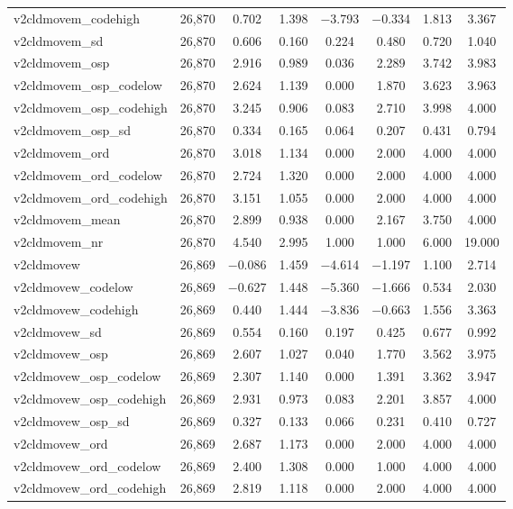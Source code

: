 \begin{table}[!htbp]
\begin{tabular}{@{\extracolsep{5pt}}lccccccc}
v2cldmovem\_codehigh & 26,870 & 0.702 & 1.398 & $-$3.793 & $-$0.334 & 1.813 & 3.367 \\ 
v2cldmovem\_sd & 26,870 & 0.606 & 0.160 & 0.224 & 0.480 & 0.720 & 1.040 \\ 
v2cldmovem\_osp & 26,870 & 2.916 & 0.989 & 0.036 & 2.289 & 3.742 & 3.983 \\ 
v2cldmovem\_osp\_codelow & 26,870 & 2.624 & 1.139 & 0.000 & 1.870 & 3.623 & 3.963 \\ 
v2cldmovem\_osp\_codehigh & 26,870 & 3.245 & 0.906 & 0.083 & 2.710 & 3.998 & 4.000 \\ 
v2cldmovem\_osp\_sd & 26,870 & 0.334 & 0.165 & 0.064 & 0.207 & 0.431 & 0.794 \\ 
v2cldmovem\_ord & 26,870 & 3.018 & 1.134 & 0.000 & 2.000 & 4.000 & 4.000 \\ 
v2cldmovem\_ord\_codelow & 26,870 & 2.724 & 1.320 & 0.000 & 2.000 & 4.000 & 4.000 \\ 
v2cldmovem\_ord\_codehigh & 26,870 & 3.151 & 1.055 & 0.000 & 2.000 & 4.000 & 4.000 \\ 
v2cldmovem\_mean & 26,870 & 2.899 & 0.938 & 0.000 & 2.167 & 3.750 & 4.000 \\ 
v2cldmovem\_nr & 26,870 & 4.540 & 2.995 & 1.000 & 1.000 & 6.000 & 19.000 \\ 
v2cldmovew & 26,869 & $-$0.086 & 1.459 & $-$4.614 & $-$1.197 & 1.100 & 2.714 \\ 
v2cldmovew\_codelow & 26,869 & $-$0.627 & 1.448 & $-$5.360 & $-$1.666 & 0.534 & 2.030 \\ 
v2cldmovew\_codehigh & 26,869 & 0.440 & 1.444 & $-$3.836 & $-$0.663 & 1.556 & 3.363 \\ 
v2cldmovew\_sd & 26,869 & 0.554 & 0.160 & 0.197 & 0.425 & 0.677 & 0.992 \\ 
v2cldmovew\_osp & 26,869 & 2.607 & 1.027 & 0.040 & 1.770 & 3.562 & 3.975 \\ 
v2cldmovew\_osp\_codelow & 26,869 & 2.307 & 1.140 & 0.000 & 1.391 & 3.362 & 3.947 \\ 
v2cldmovew\_osp\_codehigh & 26,869 & 2.931 & 0.973 & 0.083 & 2.201 & 3.857 & 4.000 \\ 
v2cldmovew\_osp\_sd & 26,869 & 0.327 & 0.133 & 0.066 & 0.231 & 0.410 & 0.727 \\ 
v2cldmovew\_ord & 26,869 & 2.687 & 1.173 & 0.000 & 2.000 & 4.000 & 4.000 \\ 
v2cldmovew\_ord\_codelow & 26,869 & 2.400 & 1.308 & 0.000 & 1.000 & 4.000 & 4.000 \\ 
v2cldmovew\_ord\_codehigh & 26,869 & 2.819 & 1.118 & 0.000 & 2.000 & 4.000 & 4.000 \\ 

\end{tabular}
\end{table}
